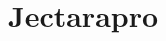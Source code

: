 \documentclass[a4paper,12pt]{article}
\begin{document}

\newpage

\tableofcontents


\clearpage
\section{Jectarapro} 
\end{document}
